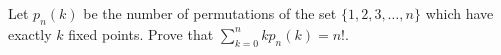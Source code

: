 Let $p_n(k)$ be the number of permutations of the set $\{1,2,3,\ldots,n\}$ which have exactly $k$ fixed points. Prove that $\sum_{k=0}^nk p_n(k)=n!$.